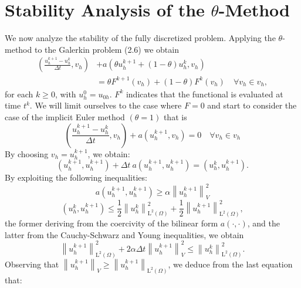 \documentclass[11pt]{book}
\begin{document}
\section*{Stability Analysis of the $\theta$-Method}
We now analyze the stability of the fully discretized problem. Applying the $\theta$-method to the Galerkin problem (2.6) we obtain
\begin{equation}
\begin{aligned}
\left(\frac{u_{h}^{k+1}-u_{h}^{k}}{\Delta t}, v_{h}\right) & +a\left(\theta u_{h}^{k+1}+(1-\theta) u_{h}^{k}, v_{h}\right) \\
& =\theta F^{k+1}\left(v_{h}\right)+(1-\theta) F^{k}\left(v_{h}\right) \quad \forall v_{h} \in v_{h},
\end{aligned}
\end{equation}
for each $k \geq 0$, with $u_{h}^{0}=u_{0 h}$.
$F^{k}$ indicates that the functional is evaluated at time $t^{k}$.
We will limit ourselves to the case where $F=0$ and start to consider the case of the implicit Euler method $(\theta=1)$ that is
\begin{equation}
\left(\frac{u_{h}^{k+1}-u_{h}^{k}}{\Delta t}, v_{h}\right)+a\left(u_{h}^{k+1}, v_{h}\right)=0 \quad \forall v_{h} \in v_{h}
\end{equation}
By choosing $v_{h}=u_{h}^{k+1}$, we obtain:
\begin{equation}
\left(u_{h}^{k+1}, u_{h}^{k+1}\right)+\Delta t \ a\left(u_{h}^{k+1}, u_{h}^{k+1}\right)=\left(u_{h}^{k}, u_{h}^{k+1}\right) .
\end{equation}
By exploiting the following inequalities:
\begin{equation}
a\left(u_{h}^{k+1}, u_{h}^{k+1}\right) \geq \alpha\left\|u_{h}^{k+1}\right\|_{V}^{2}
\end{equation}
\begin{equation}
\left(u_{h}^{k}, u_{h}^{k+1}\right) \leq \frac{1}{2}\left\|u_{h}^{k}\right\|_{\mathrm{L}^{2}(\Omega)}^{2}+\frac{1}{2}\left\|u_{h}^{k+1}\right\|_{\mathrm{L}^{2}(\Omega)}^{2},
\end{equation}
the former deriving from the coercivity of the bilinear form $a(\cdot, \cdot)$, and the latter from the Cauchy-Schwarz and Young inequalities, we obtain
\begin{equation}
\left\|u_{h}^{k+1}\right\|_{\mathrm{L}^{2}(\Omega)}^{2}+2 \alpha \Delta t\left\|u_{h}^{k+1}\right\|_{V}^{2} \leq\left\|u_{h}^{k}\right\|_{\mathrm{L}^{2}(\Omega)}^{2} .
\end{equation}
Observing that $\left\|u_{h}^{k+1}\right\|_{V} \geq\left\|u_{h}^{k+1}\right\|_{\mathrm{L}^{2}(\Omega)}$, we deduce from the last equation that:
\end{document}
